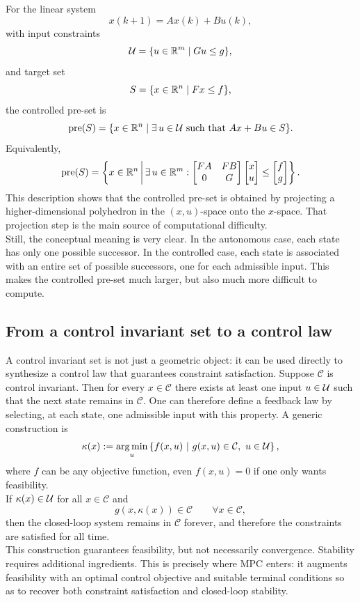 For the linear system
\[
x(k+1)=Ax(k)+Bu(k),
\]
with input constraints
\[
\mathcal{U}=\{u\in \mathbb{R}^m \mid Gu\leq g\},
\]
and target set
\[
S=\{x\in \mathbb{R}^n \mid Fx\leq f\},
\]
the controlled pre-set is
\[
\operatorname{pre}(S)
=
\{x\in \mathbb{R}^n \mid \exists\,u\in \mathcal{U} \text{ such that } Ax+Bu\in S\}.
\]
Equivalently,
\[
\operatorname{pre}(S)
=
\left\{
x\in \mathbb{R}^n \,\middle|\,
\exists\,u\in \mathbb{R}^m:
\begin{bmatrix}
FA & FB\\
0 & G
\end{bmatrix}
\begin{bmatrix}
x\\u
\end{bmatrix}
\leq
\begin{bmatrix}
f\\g
\end{bmatrix}
\right\}.
\]
This description shows that the controlled pre-set is obtained by projecting a higher-dimensional
polyhedron in the \((x,u)\)-space onto the \(x\)-space. That projection step is the main source of
computational difficulty.\\
Still, the conceptual meaning is very clear. In the autonomous case, each state has only one
possible successor. In the controlled case, each state is associated with an entire set of possible
successors, one for each admissible input. This makes the controlled pre-set much larger, but also
much more difficult to compute.

\subsection{From a control invariant set to a control law}

A control invariant set is not just a geometric object: it can be used directly to synthesize a control
law that guarantees constraint satisfaction. Suppose \(\mathcal C\) is control invariant. Then for every
\(x\in \mathcal C\) there exists at least one input \(u\in \mathcal{U}\) such that the next state remains in
\(\mathcal C\). One can therefore define a feedback law by selecting, at each state, one admissible
input with this property. A generic construction is
\[
\kappa(x)
:=
\operatorname*{arg\,min}_{u}
\left\{
f(x,u)\ \middle|\ g(x,u)\in \mathcal C,\ u\in \mathcal{U}
\right\},
\]
where \(f\) can be any objective function, even \(f(x,u)=0\) if one only wants feasibility.\\
If \(\kappa(x)\in \mathcal{U}\) for all \(x\in \mathcal C\) and
\[
g(x,\kappa(x))\in \mathcal C \qquad \forall x\in \mathcal C,
\]
then the closed-loop system remains in \(\mathcal C\) forever, and therefore the constraints are
satisfied for all time.\\
This construction guarantees feasibility, but not necessarily convergence. Stability requires
additional ingredients. This is precisely where MPC enters: it augments feasibility with an optimal
control objective and suitable terminal conditions so as to recover both constraint satisfaction and
closed-loop stability.

